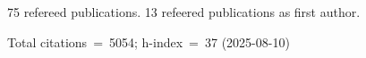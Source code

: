 75 refereed publications. 13 refeered publications as first author.

Total citations~=~5054; h-index~=~37 (2025-08-10)